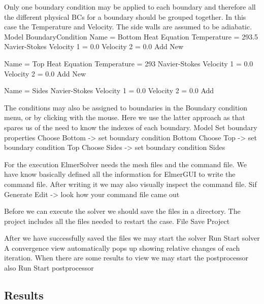 Only one boundary condition may be applied to each boundary and therefore all the 
different physical BCs for a boundary should be grouped together. In this case the
Temperature and Velocity. The side walls are assumed to be adiabatic.
\ttbegin
Model
  BoundaryCondition
    Name = Bottom
    Heat Equation
      Temperature = 293.5
    Navier-Stokes 
      Velocity 1 = 0.0
      Velocity 2 = 0.0
    Add
    New

    Name = Top
    Heat Equation
      Temperature = 293
    Navier-Stokes 
      Velocity 1 = 0.0
      Velocity 2 = 0.0
    Add 
    New
 
    Name = Sides
    Navier-Stokes 
      Velocity 1 = 0.0
      Velocity 2 = 0.0
    Add
\ttend   

The conditions may also be assigned to boundaries in the Boundary condition menu, or 
by clicking with the mouse. Here we use the latter approach as that spares us of the 
need to know the indexes of each boundary.
\ttbegin
Model
  Set boundary properties
    Choose Bottom -> set boundary condition Bottom
    Choose Top -> set boundary condition Top
    Choose Sides -> set boundary condition Sides
\ttend


For the execution 
ElmerSolver needs the mesh files and the command file. We have know basically defined
all the information for ElmerGUI to write the command file. After writing it we may also visually 
inspect the command file.
\ttbegin
Sif 
  Generate
  Edit -> look how your command file came out  
\ttend

Before we can execute the solver we should save the files in a directory. The project includes
all the files needed to restart the case.
\ttbegin
File 
  Save Project
\ttend

After we have successfully saved the files we may start the solver
\ttbegin
Run
  Start solver
\ttend
A convergence view automatically pops up showing relative changes of each iteration.
When there are some results to view we may start the postprocessor also
\ttbegin
Run
  Start postprocessor
\ttend


\subsection*{Results}

